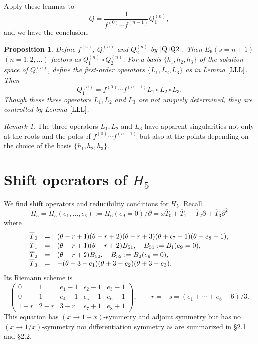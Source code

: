 \documentclass[a4paper,12pt]{article}
\newtheorem{prp}[thm]{Proposition}
\theoremstyle{definition}
\theoremstyle{remark}
\newtheorem{remark}[thm]{Remark}
\numberwithin{equation}{section} %
\begin{document}
Apply these lemmas to
$$Q=\frac{1}{f^{(0)}\cdots f^{(n-1)}}Q_1^{(n)},$$
and we have the conclusion.

\begin{prp}Define $f^{(n)}$, $Q_1^{(n)}$ and $Q_2^{(n)}$ by $\eqref{Q1Q2}$. Then $E_6(s=n+1)$ $(n=1,2,\dots)$ factors as $Q_1^{(n)}\circ Q_2^{(n)}$. For a basis $\{h_1,h_2,h_3\}$ of the solution space of $Q_1^{(n)}$, define
  the first-order operators $\{L_1,L_2,L_3\}$ as in Lemma $\ref{LLL}$. Then
  $$Q_1^{(n)}=f^{(0)}\cdots f^{(n-1)}L_1\circ L_2\circ L_3.$$
  Though these three operators  $L_1,L_2$ and $L_3$ are not uniquely determined,
  they are controlled by Lemma $\ref{LLL}$.
\end{prp}

\begin{remark}
  The three operators $L_1,L_2$ and $L_3$ have apparent singularities not only at the roots and the poles of $f^{(0)}\cdots f^{(n-1)}$ but also at the points depending on the choice of the basis $\{h_1,h_2,h_3\}$.%
\end{remark}

\section{Shift operators of $H_5$}\label{E5}
\secttoc
We find shift operators and reducibility conditions for $H_5$.
Recall 
  \[H_5=H_5(e_1,\dots,e_8):=H_6(e_9=0)/\partial=x\overline{T}_0+\overline{T}_1+\overline{T}_2\partial +\overline{T}_3\partial ^2\]
where
\[\def\arraystretch{1.1} \begin{array}{rcl}
   \overline{T}_0 &=& (\theta-r+1)(\theta-r+2)(\theta-r+3)(\theta+e_7+1)(\theta+e_8+1), \\
   \overline{T}_1 &=& (\theta-r+1)(\theta-r+2)B_{51},\quad B_{51}:=B_1(e_9=0),\\
   \overline{T}_2 &=& (\theta-r+2)B_{52},\quad B_{52}:=B_2(e_9=0), \\
   \overline{T}_3 &=& -(\theta+3-e_1)(\theta+3-e_2)(\theta+3-e_3).
\end{array} \]
Its Riemann scheme is
$$ \left(\begin{array}{ccccc}
  0&1&e_1-1&e_2-1&e_3-1\\
  0&1&e_4-1&e_5-1&e_6-1\\ 
    1-r&2-r&3-r&e_7+1&e_8+1\end{array}\right),\qquad r=-s=(e_1+\cdots+e_8-6)/3.$$
This equation has $(x\to1-x)$-symmetry and adjoint symmetry
    but has no $(x\to1/x)$-symmetry nor differentiation symmetry
    as are summarized in \S 2.1 and \S 2.2.
\end{document}

